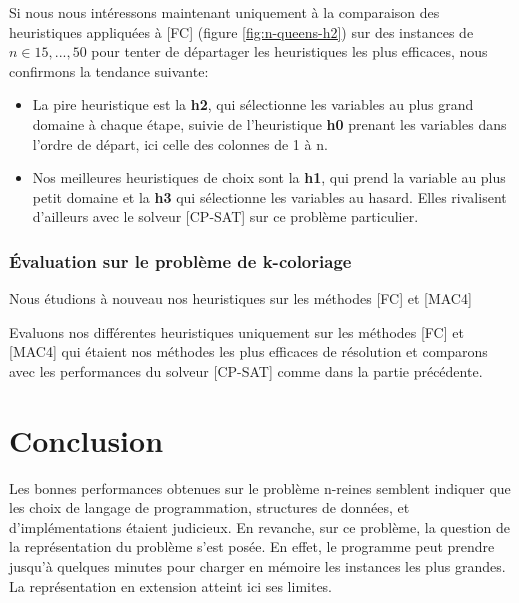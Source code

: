 \documentclass[14pt]{article}
\begin{document}
Si nous nous intéressons maintenant uniquement à la comparaison des heuristiques appliquées à [FC] (figure \ref{fig:n-queens-h2}) sur des instances de $n \in 15,...,50$ pour tenter de départager les heuristiques les plus efficaces, nous confirmons la tendance suivante:

\begin{itemize}
    \item La pire heuristique est la \textbf{h2}, qui sélectionne les variables au plus grand domaine à chaque étape, suivie de l'heuristique \textbf{h0} prenant les variables dans l'ordre de départ, ici celle des colonnes de 1 à n.
    \item Nos meilleures heuristiques de choix sont la \textbf{h1}, qui prend la variable au plus petit domaine et la \textbf{h3} qui sélectionne les variables au hasard. Elles rivalisent d'ailleurs avec le solveur [CP-SAT] sur ce problème particulier.
\end{itemize}


\subsubsection{Évaluation sur le problème de k-coloriage}

Nous étudions à nouveau nos heuristiques sur les méthodes [FC] et [MAC4]

Evaluons nos différentes heuristiques uniquement sur les méthodes [FC] et [MAC4] qui étaient nos méthodes les plus efficaces de résolution et comparons avec les performances du solveur [CP-SAT] comme dans la partie précédente.


\clearpage

\section{Conclusion}

Les bonnes performances obtenues sur le problème n-reines semblent indiquer que les choix de langage de programmation, structures de données, et d'implémentations étaient judicieux. En revanche, sur ce problème, la question de la représentation du problème s'est posée. En effet, le programme peut prendre jusqu'à quelques minutes pour charger en mémoire les instances les plus grandes. La représentation en extension atteint ici ses limites.\\
\end{document}
